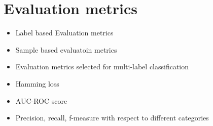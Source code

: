 \section{Evaluation metrics} \cite{tsoumakas2007multi}
\cite{zhang2013review}
    \begin{itemize}
        \item Label based Evaluation metrics
        \item Sample based evaluatoin metrics
        \item Evaluation metrics selected for multi-label classification 
        \item Hamming loss 
        \item AUC-ROC score 
        \item Precision, recall, f-measure with respect to different categories
    \end{itemize}
    